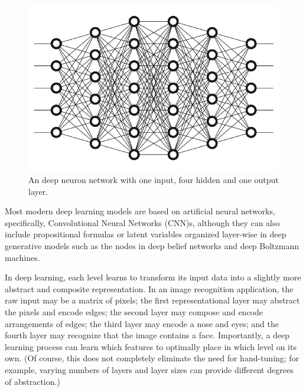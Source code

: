 \begin{figure}[htbp]
	\centering
		\includegraphics[width=0.6\linewidth]{images/deep_neural_network.jpeg}
	\caption{An deep neuron network with one input, four hidden and one output layer.}
	\label{fig:deep_neural_network}
	\end{figure}

Most modern deep learning models are based on artificial neural networks, specifically, Convolutional Neural Networks (CNN)s, although they can also include propositional formulas or latent variables organized layer-wise in deep generative models such as the nodes in deep belief networks and deep Boltzmann machines.\cite{bengio2009learning}

In deep learning, each level learns to transform its input data into a slightly more abstract and composite representation. In an image recognition application, the raw input may be a matrix of pixels; the first representational layer may abstract the pixels and encode edges; the second layer may compose and encode arrangements of edges; the third layer may encode a nose and eyes; and the fourth layer may recognize that the image contains a face. Importantly, a deep learning process can learn which features to optimally place in which level on its own. (Of course, this does not completely eliminate the need for hand-tuning; for example, varying numbers of layers and layer sizes can provide different degrees of abstraction.)\cite{bengio2013representation,lecun2015deep}
